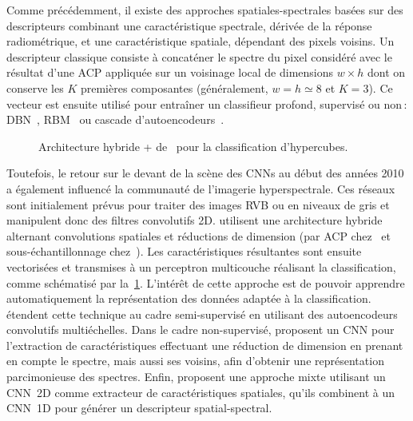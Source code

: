 Comme précédemment, il existe des approches spatiales-spectrales basées sur des descripteurs combinant une caractéristique spectrale, dérivée de la réponse radiométrique, et une caractéristique spatiale, dépendant des pixels voisins. Un descripteur classique consiste à concaténer le spectre du pixel considéré avec le résultat d'une \gls{ACP} appliquée sur un voisinage local de dimensions $w\times h$ dont on conserve les $K$ premières composantes (généralement, $w = h \simeq 8$ et $K = 3$). Ce vecteur est ensuite utilisé pour entraîner un classifieur profond, supervisé ou non\,: \gls{DBN}~\cite{li_classification_2014,chen_spectral-spatial_2015}, \gls{RBM}~\cite{lin_spectral-spatial_2013,midhun_deep_2014} ou cascade d'autoencodeurs~\cite{chen_deep_2014,ma_spectral-spatial_2016,tao_unsupervised_2015,wang_spectralspatial_2017}.

\begin{figure}[h]
  \resizebox{\textwidth}{!}{}
  \caption[Architecture hybride + pour la classification d'hypercubes.]{Architecture hybride + de~\citet{makantasis_deep_2015} pour la classification d'hypercubes.}
  \label{fig:pcacnn}
\end{figure}

Toutefois, le retour sur le devant de la scène des \glspl{CNN} au début des années 2010 a également influencé la communauté de l'imagerie hyperspectrale. Ces réseaux sont initialement prévus pour traiter des images \gls{RVB} ou en niveaux de gris et manipulent donc des filtres convolutifs 2D. \citet{makantasis_deep_2015,slavkovikj_hyperspectral_2015} utilisent une architecture hybride alternant convolutions spatiales et réductions de dimension (par \gls{ACP} chez~\citet{makantasis_deep_2015} et sous-échantillonnage chez~\citet{slavkovikj_hyperspectral_2015}). Les caractéristiques résultantes sont ensuite vectorisées et transmises à un perceptron multicouche réalisant la classification, comme schématisé par la~\cref{fig:pcacnn}. L'intérêt de cette approche est de pouvoir apprendre automatiquement la représentation des données adaptée à la classification. \citet{zhao_combining_2015} étendent cette technique au cadre semi-supervisé en utilisant des autoencodeurs convolutifs multiéchelles. Dans le cadre non-supervisé, \citet{romero_unsupervised_2015} proposent un \gls{CNN} pour l'extraction de caractéristiques effectuant une réduction de dimension en prenant en compte le spectre, mais aussi ses voisins, afin d'obtenir une représentation parcimonieuse des spectres. Enfin, \citet{zhao_spectral-spatial_2016,yue_spectral-spatial_2015} proposent une approche mixte utilisant un \gls{CNN}~2D comme extracteur de caractéristiques spatiales, qu'ils combinent à un \gls{CNN}~1D pour générer un descripteur spatial-spectral.


